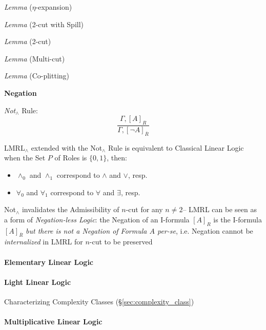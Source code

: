 \emph{Lemma} ($\eta$-expansion)

\emph{Lemma} (2-cut with Spill)

\emph{Lemma} (2-cut)

\emph{Lemma} (Multi-cut)

\emph{Lemma} (Co-plitting)



\textbf{Negation}

\emph{Not$_\wedge$} Rule:
\[
  \frac{
    \Gamma, [A]_R
  }{
    \Gamma, [\neg A]_{\overline{R}}
  }
\]

LMRL$_\wedge$ extended with the Not$_\wedge$ Rule is equivalent to
Classical Linear Logic when the Set $P$ of Roles is $\{0,1\}$, then:
\begin{itemize}
  \item $\wedge_0$ and $\wedge_1$ correspond to $\wedge$ and $\vee$,
    resp.
  \item $\forall_0$ and $\forall_1$ correspond to $\forall$ and
    $\exists$, resp.
\end{itemize}

Not$_\wedge$ invalidates the Admissibility of $n$-cut for any $n \neq
2$-- LMRL can be seen as a form of \emph{Negation-less Logic}: the
Negation of an I-formula $[A]_R$ is the I-formula $[A]_{\overline{R}}$
\emph{but there is not a Negation of Formula $A$ per-se}, i.e.
Negation cannot be \emph{internalized} in LMRL for $n$-cut to be
preserved


\endgroup



\paragraph{Elementary Linear Logic}\label{sec:elementary_linear_logic}\hfill

\paragraph{Light Linear Logic}\label{sec:light_linear_logic}\hfill

Characterizing Complexity Classes (\S\ref{sec:complexity_class})



\paragraph{Multiplicative Linear Logic}\hfill
\label{sec:multiplicative_linear_logic}

\cite{haghverdi-scott05}

